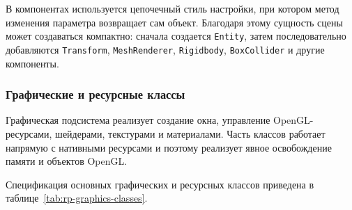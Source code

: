 В компонентах используется цепочечный стиль настройки, при котором метод
изменения параметра возвращает сам объект. Благодаря этому сущность сцены может
создаваться компактно: сначала создается \texttt{Entity}, затем последовательно
добавляются \texttt{Transform}, \texttt{MeshRenderer}, \texttt{Rigidbody},
\texttt{BoxCollider} и другие компоненты.

\subsubsection{Графические и ресурсные классы}

Графическая подсистема реализует создание окна, управление OpenGL-ресурсами,
шейдерами, текстурами и материалами. Часть классов работает напрямую с нативными
ресурсами и поэтому реализует явное освобождение памяти и объектов OpenGL.

Спецификация основных графических и ресурсных классов приведена в
таблице~\ref{tab:rp-graphics-classes}.

